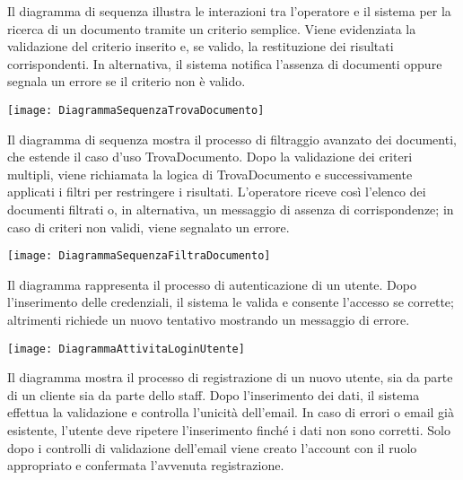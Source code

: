 \documentclass[a4paper]{report}
\begin{document}
\clearpage
{}
\noindent
Il diagramma di sequenza illustra le interazioni tra l’operatore e il sistema per la ricerca di un documento tramite un criterio semplice. Viene evidenziata la validazione del criterio inserito e, se valido, la restituzione dei risultati corrispondenti. In alternativa, il sistema notifica l’assenza di documenti oppure segnala un errore se il criterio non è valido.

\begin{figure*}[!ht]
    \centering
    \texttt{[image: DiagrammaSequenzaTrovaDocumento]}
\end{figure*}

\clearpage
{}
\noindent
Il diagramma di sequenza mostra il processo di filtraggio avanzato dei documenti, che estende il caso d’uso TrovaDocumento. Dopo la validazione dei criteri multipli, viene richiamata la logica di TrovaDocumento e successivamente applicati i filtri per restringere i risultati. L’operatore riceve così l’elenco dei documenti filtrati o, in alternativa, un messaggio di assenza di corrispondenze; in caso di criteri non validi, viene segnalato un errore.

\begin{figure*}[!ht]
    \centering
    \texttt{[image: DiagrammaSequenzaFiltraDocumento]}
\end{figure*}

\clearpage
{}

Il diagramma rappresenta il processo di autenticazione di un utente. Dopo l’inserimento delle credenziali, il sistema le valida e consente l’accesso se corrette; altrimenti richiede un nuovo tentativo mostrando un messaggio di errore.

\begin{figure*}[!ht]
    \centering
    \texttt{[image: DiagrammaAttivitaLoginUtente]}
\end{figure*}

\clearpage
{}
Il diagramma mostra il processo di registrazione di un nuovo utente, sia da parte di un cliente sia da parte dello staff. Dopo l’inserimento dei dati, il sistema effettua la validazione e controlla l’unicità dell’email. In caso di errori o email già esistente, l’utente deve ripetere l’inserimento finché i dati non sono corretti. Solo dopo i controlli di validazione dell'email viene creato l’account con il ruolo appropriato e confermata l’avvenuta registrazione.
\end{document}
